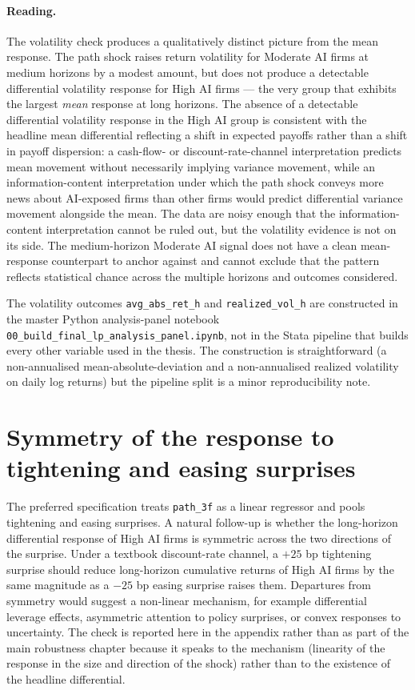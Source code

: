 \paragraph{Reading.} The volatility check produces a qualitatively
distinct picture from the mean response. The path shock raises
return volatility for Moderate AI firms at medium horizons by a
modest amount, but does not produce a detectable differential
volatility response for High AI firms --- the very group that
exhibits the largest \emph{mean} response at long horizons. The
absence of a detectable differential volatility response in the
High AI group is consistent with the headline mean differential
reflecting a shift in expected payoffs rather than a shift in
payoff dispersion: a cash-flow- or discount-rate-channel
interpretation predicts mean movement without necessarily implying
variance movement, while an information-content interpretation
under which the path shock conveys more news about AI-exposed firms
than other firms would predict differential variance movement
alongside the mean. The data are noisy enough that the
information-content interpretation cannot be ruled out, but the
volatility evidence is not on its side. The medium-horizon Moderate
AI signal does not have a clean mean-response counterpart to anchor
against and cannot exclude that the pattern reflects statistical
chance across the multiple horizons and outcomes considered.

The volatility outcomes \texttt{avg\_abs\_ret\_h} and
\texttt{realized\_vol\_h} are constructed in the master Python
analysis-panel notebook \texttt{00\_build\_final\_lp\_analysis\_panel.ipynb},
not in the Stata pipeline that builds every other variable used in
the thesis. The construction is straightforward (a non-annualised
mean-absolute-deviation and a non-annualised realized volatility on
daily log returns) but the pipeline split is a minor
reproducibility note.

\section{Symmetry of the response to tightening and easing surprises}
\label{app:rob-asymmetry}

The preferred specification treats \texttt{path\_3f} as a linear
regressor and pools tightening and easing surprises. A natural
follow-up is whether the long-horizon differential response of High
AI firms is symmetric across the two directions of the surprise.
Under a textbook discount-rate channel, a $+25$ bp tightening
surprise should reduce long-horizon cumulative returns of High AI
firms by the same magnitude as a $-25$ bp easing surprise raises
them. Departures from symmetry would suggest a non-linear mechanism,
for example differential leverage effects, asymmetric attention to
policy surprises, or convex responses to uncertainty. The check is
reported here in the appendix rather than as part of the main
robustness chapter because it speaks to the mechanism (linearity of
the response in the size and direction of the shock) rather than to
the existence of the headline differential.

